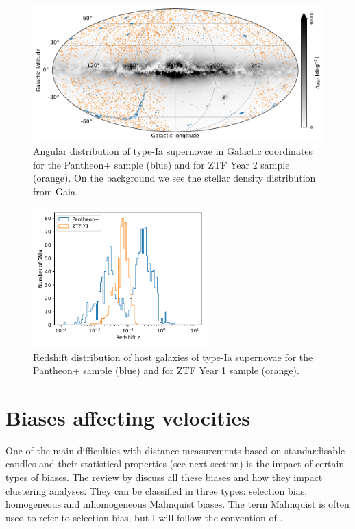     \begin{figure}[t] 
        \centering 
        \includegraphics[width=\textwidth]{fig/velocities/ztf_pantheon_gaia.pdf}
        \caption{Angular distribution of type-Ia supernovae in Galactic coordinates
        for the Pantheon+ sample (blue) and for ZTF Year 2 sample (orange). 
        On the background we see the stellar density distribution from Gaia. 
        }
        \label{fig:pantheon_ztf_sky}
    \end{figure}

    \begin{figure}[t] 
        \centering 
        \includegraphics[width=0.6\textwidth]{fig/velocities/nz_ztfy1_pantheon.pdf}
        \caption{Redshift distribution of host galaxies of type-Ia supernovae 
        for the Pantheon+ sample (blue) and for ZTF Year 1 sample (orange).
        }
        \label{fig:pantheon_ztf_redshift}
    \end{figure}

\section{Biases affecting velocities}
\label{velocities:biases}

One of the main difficulties with distance measurements based on standardisable candles 
and their statistical properties (see next section) is the impact of certain types of biases. 
The review by \cite{straussDensityPeculiarVelocity1995} discuss all these biases and how they  
impact clustering analyses. They can be classified in three types: selection bias, homogeneous 
and inhomogeneous Malmquist biases. The term Malmquist is often used to refer to selection bias,
but I will follow the convention of \cite{straussDensityPeculiarVelocity1995}. 

